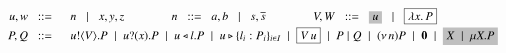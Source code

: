 	\begin{figure}[t]
	\[ 
		\begin{array}{rl}
			u,w  \bnfis& n \bnfbar x,y,z
			\qquad \qquad
			n \bnfis a,b \bnfbar s, \dual{s} 
			\qquad \qquad
			V,W \bnfis \nonhosyntax{u} \bnfbar \nonpisyntax{\abs{x}{P}}
			\\[1mm]

			P,Q
			 \bnfis &
			\bout{u}{V}{P}  \sbnfbar  \binp{u}{x}{P} \sbnfbar
			\bsel{u}{l} P \sbnfbar \bbra{u}{l_i:P_i}_{i \in I} \sbnfbar \nonpisyntax{\appl{V}{u}} \sbnfbar P\Par Q \sbnfbar \news{n} P 
			\sbnfbar \inact \sbnfbar \nonhosyntax{\rvar{X} \sbnfbar \recp{X}{P}}
		\end{array}
	\]
	\caption{}
	\label{fig:syntax}
\end{figure}

